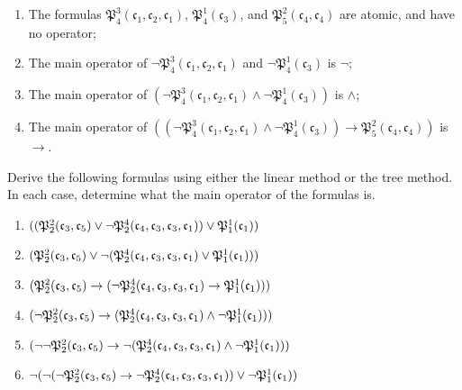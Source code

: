 \begin{enumerate}
	\item The formulas $\mathfrak{P}^3_4(\mathfrak{c}_1, \mathfrak{c_2}, \mathfrak{c_1})$, $\mathfrak{P}^1_4(\mathfrak{c}_3)$, and $\mathfrak{P}^2_5(\mathfrak{c}_4, \mathfrak{c}_4)$ are atomic, and have no operator;
	\item The main operator of $\neg\mathfrak{P}^3_4(\mathfrak{c}_1, \mathfrak{c_2}, \mathfrak{c_1})$ and $\neg\mathfrak{P}^1_4(\mathfrak{c}_3)$ is $\neg$;
	\item The main operator of $(\neg \mathfrak{P}^3_4(\mathfrak{c}_1, \mathfrak{c_2}, \mathfrak{c_1}) \wedge \neg \mathfrak{P}^1_4(\mathfrak{c}_3))$ is $\wedge$;
	\item The main operator of $((\neg \mathfrak{P}^3_4(\mathfrak{c}_1, \mathfrak{c_2}, \mathfrak{c_1}) \wedge \neg \mathfrak{P}^1_4(\mathfrak{c}_3)) \rightarrow \mathfrak{P}^2_5(\mathfrak{c}_4, \mathfrak{c}_4))$ is $\rightarrow$.
\end{enumerate}

\begin{exc}
Derive the following formulas using either the linear method or the tree method. In each case, determine what the main operator of the formulas is. 

\begin{enumerate}
	\item $((\mathfrak{P}^{2}_{2}(\mathfrak{c}_{3}, \mathfrak{c}_{5})\vee \neg\mathfrak{P}^{4}_{2}(\mathfrak{c}_{4}, \mathfrak{c}_{3}, \mathfrak{c}_{3}, \mathfrak{c}_{1})) \vee \mathfrak{P}^{1}_{1}(\mathfrak{c}_{1}))$
	\item $(\mathfrak{P}^{2}_{2}(\mathfrak{c}_{3}, \mathfrak{c}_{5})\vee \neg(\mathfrak{P}^{4}_{2}(\mathfrak{c}_{4}, \mathfrak{c}_{3}, \mathfrak{c}_{3}, \mathfrak{c}_{1}) \vee \mathfrak{P}^{1}_{1}(\mathfrak{c}_{1})))$
	\item $(\mathfrak{P}^{2}_{2}(\mathfrak{c}_{3}, \mathfrak{c}_{5})\rightarrow (\neg\mathfrak{P}^{4}_{2}(\mathfrak{c}_{4}, \mathfrak{c}_{3}, \mathfrak{c}_{3}, \mathfrak{c}_{1}) \rightarrow \mathfrak{P}^{1}_{1}(\mathfrak{c}_{1})))$
	\item $(\neg\mathfrak{P}^{2}_{2}(\mathfrak{c}_{3}, \mathfrak{c}_{5})\rightarrow (\mathfrak{P}^{4}_{2}(\mathfrak{c}_{4}, \mathfrak{c}_{3}, \mathfrak{c}_{3}, \mathfrak{c}_{1}) \wedge \neg \mathfrak{P}^{1}_{1}(\mathfrak{c}_{1})))$
	\item $(\neg\neg\mathfrak{P}^{2}_{2}(\mathfrak{c}_{3}, \mathfrak{c}_{5})\rightarrow \neg (\mathfrak{P}^{4}_{2}(\mathfrak{c}_{4}, \mathfrak{c}_{3}, \mathfrak{c}_{3}, \mathfrak{c}_{1}) \wedge \neg \mathfrak{P}^{1}_{1}(\mathfrak{c}_{1})))$
	\item $\neg(\neg(\neg\mathfrak{P}^{2}_{2}(\mathfrak{c}_{3}, \mathfrak{c}_{5})\rightarrow \neg\mathfrak{P}^{4}_{2}(\mathfrak{c}_{4}, \mathfrak{c}_{3}, \mathfrak{c}_{3}, \mathfrak{c}_{1})) \vee \neg \mathfrak{P}^{1}_{1}(\mathfrak{c}_{1}))$
\end{enumerate}
\end{exc}


